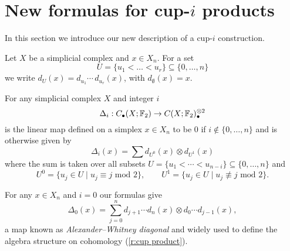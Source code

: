 
\section{New formulas for cup-\texorpdfstring{$i$}{i} products} \label{s:formulas}


In this section we introduce our new description of a cup-$i$ construction.

\begin{notation}
	Let $X$ be a simplicial complex and $x \in X_n$.
	For a set
	\begin{equation*}
	U = \{u_1 < \dots < u_r\} \subseteq \{0, \dots, n\}
	\end{equation*}
	we write $d_U(x) = d_{u_1}\! \dotsm \, d_{u_r}(x)$, with $d_{\emptyset}(x) = x$.
\end{notation}

\begin{definition} \label{d:cup-i coproducts}
	For any simplicial complex $X$ and integer $i$
	\begin{equation*}
	\Delta_i : C_\bullet(X; {\mathbb{F}_2}) \to C(X; {\mathbb{F}_2})^{\otimes 2}_\bullet
	\end{equation*}
	is the linear map defined on a simplex $x \in X_n$ to be $0$ if $i \not\in \{0, \dots, n\}$ and is otherwise given by
	\begin{equation} \label{e:new formulas}
	\Delta_i(x) = \sum d_{U^0}(x) \otimes d_{U^1}(x)
	\end{equation}
	where the sum is taken over all subsets $U = \{u_1 < \cdots < u_{n-i}\} \subseteq \{0, \dots, n\}$ and
	\begin{equation} \label{e:partition subsets}
	U^0 = \{u_j \in U\mid u_j \equiv j \text{ mod } 2\}, \qquad
	U^1 = \{u_j \in U\mid u_j \not\equiv j \text{ mod } 2\}.
	\end{equation}
\end{definition}

\begin{example} \label{ex:alexander-whitney diagonal}
	For any $x \in X_n$ and $i = 0$ our formulas give
	\begin{equation*}
	\Delta_0(x) = \sum_{j=0}^n d_{j+1} \cdots d_{n}(x) \otimes d_{0} \cdots d_{j-1}(x),
	\end{equation*}
	a map known as \textit{Alexander--Whitney diagonal} and widely used to define the algebra structure on cohomology (\cref{r:cup product}).
\end{example}

